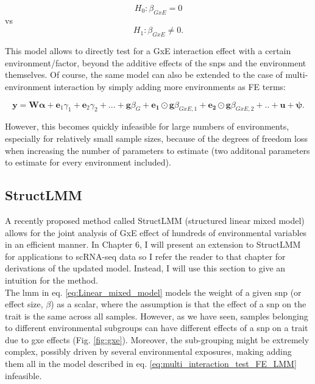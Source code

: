 \begin{equation}
 H_{0}: \beta_{GxE}=0 
\end{equation}
vs
\begin{equation}
 H_{1}: \beta_{GxE} \neq 0. 
\end{equation}

This model allows to directly test for a GxE interaction effect with a certain environment/factor, beyond the additive effects of the \gls{snp}s and the environment themselves. 
Of course, the same model can also be extended to the case of multi-environment interaction by simply adding more environments as FE terms:

\begin{equation}\label{eq:multi_interaction_test_FE_LMM}
 \mathbf{y} =  \mathbf{W}\boldsymbol{\alpha} + \mathbf{e}_1\gamma_1 + \mathbf{e}_2\gamma_2 + ...  + \mathbf{g}\beta_G + \mathbf{e_1}\odot\mathbf{g}\beta_{GxE,1}+ \mathbf{e_2}\odot\mathbf{g}\beta_{GxE,2} + .. + \mathbf{u} + \boldsymbol{\psi}. 
\end{equation}

However, this becomes quickly infeasible for large numbers of environments, especially for relatively small sample sizes, because of the degrees of freedom loss when increasing the number of parameters to estimate (two additonal parameters to estimate for every environment included).


\subsection{StructLMM}

A recently proposed method called StructLMM (structured linear mixed model) allows for the joint analysis of GxE effect of hundreds of environmental variables \cite{moore2019linear} in an efficient manner.
In Chapter 6, I will present an extension to StructLMM for applications to scRNA-seq data so I refer the reader to that chapter for derivations of the updated model.
Instead, I will use this section to give an intuition for the method.\\

The \gls{lmm} in eq. \eqref{eq:Linear_mixed_model} models the weight of a given \gls{snp} (or effect size, $\beta$) as a scalar, where the assumption is that the effect of a \gls{snp} on the trait is the same across all samples.
However, as we have seen, samples belonging to different environmental subgroups can have different effects of a \gls{snp} on a trait due to \gls{gxe} effects (Fig. \ref{fig:gxe}).
Moreover, the sub-grouping might be extremely complex, possibly driven by several environmental exposures, making adding them all in the model described in eq. \eqref{eq:multi_interaction_test_FE_LMM} infeasible.\\

